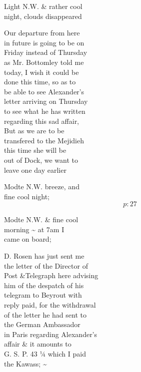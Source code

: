 \documentclass{report}
\begin{document}
	\par{
 	Light N.W. \& rather cool\ \\night, clouds disappeared\ \\
	}

	\par{
 	Our departure from here\ \\in future is going to be on\ \\Friday instead of Thursday\ \\as Mr. Bottomley told me\ \\today, I wish it could be\ \\done this time, so as to\ \\be able to see Alexander’s\ \\letter arriving on Thursday\ \\to see what he has written\ \\regarding this sad affair,\ \\But as we are to be\ \\transfered to the Mejidieh\ \\this time she will be\ \\out of Dock, we want to\ \\leave one day earlier\ \\
	}

	\par{
 	Modte N.W. breeze, and\ \\fine cool night;\ \\
  \[p: 27 \]

	}



	\par{
 	Modte N.W. \& fine cool\ \\morning \~{} at 7am I\ \\came on board;\ \\
	}

	\par{
 	D. Rosen has just sent me\ \\the letter of the Director of\ \\Post \&Telegraph here advising\ \\him of the despatch of his\ \\telegram to Beyrout with\ \\reply paid, for the withdrawal\ \\of the letter he had sent to\ \\the German Ambassador\ \\in Paris regarding Alexander’s\ \\affair \& it amounts to\ \\G. S. P. 43 ¼ which I paid\ \\the Kawass; \~{}\ \\
	}
\end{document}
